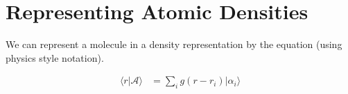 \documentclass[book.tex]{subfiles}
\begin{document}
\section{Representing Atomic Densities}

We can represent a molecule in a density representation by the equation (using physics style notation).

\begin{align}
    \langle r | \mathcal{A} \rangle &= \sum_i g(r-r_i)|\alpha_i \rangle
\end{align}
\end{document}
